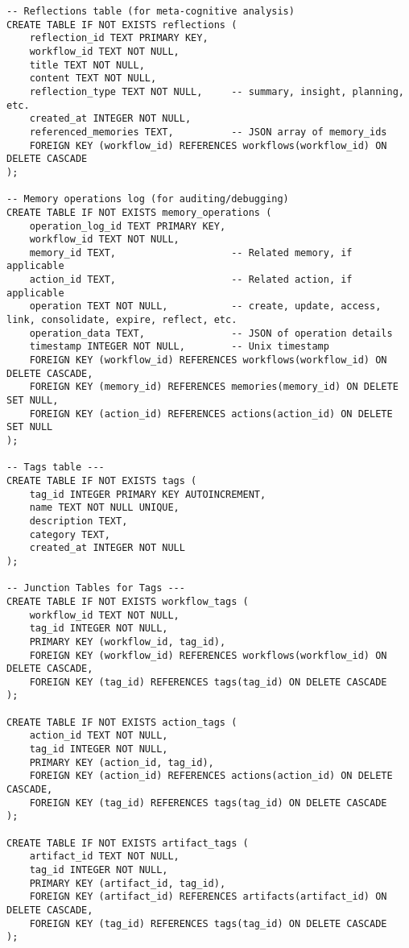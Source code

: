 \documentclass[12pt,a4paper]{article}
\begin{document}
\begin{pageablecode}
\begin{verbatim}
-- Reflections table (for meta-cognitive analysis)
CREATE TABLE IF NOT EXISTS reflections (
    reflection_id TEXT PRIMARY KEY,
    workflow_id TEXT NOT NULL,
    title TEXT NOT NULL,
    content TEXT NOT NULL,
    reflection_type TEXT NOT NULL,     -- summary, insight, planning, etc.
    created_at INTEGER NOT NULL,
    referenced_memories TEXT,          -- JSON array of memory_ids
    FOREIGN KEY (workflow_id) REFERENCES workflows(workflow_id) ON DELETE CASCADE
);

-- Memory operations log (for auditing/debugging)
CREATE TABLE IF NOT EXISTS memory_operations (
    operation_log_id TEXT PRIMARY KEY,
    workflow_id TEXT NOT NULL,
    memory_id TEXT,                    -- Related memory, if applicable
    action_id TEXT,                    -- Related action, if applicable
    operation TEXT NOT NULL,           -- create, update, access, link, consolidate, expire, reflect, etc.
    operation_data TEXT,               -- JSON of operation details
    timestamp INTEGER NOT NULL,        -- Unix timestamp
    FOREIGN KEY (workflow_id) REFERENCES workflows(workflow_id) ON DELETE CASCADE,
    FOREIGN KEY (memory_id) REFERENCES memories(memory_id) ON DELETE SET NULL,
    FOREIGN KEY (action_id) REFERENCES actions(action_id) ON DELETE SET NULL
);

-- Tags table ---
CREATE TABLE IF NOT EXISTS tags (
    tag_id INTEGER PRIMARY KEY AUTOINCREMENT,
    name TEXT NOT NULL UNIQUE,
    description TEXT,
    category TEXT,
    created_at INTEGER NOT NULL
);

-- Junction Tables for Tags ---
CREATE TABLE IF NOT EXISTS workflow_tags (
    workflow_id TEXT NOT NULL,
    tag_id INTEGER NOT NULL,
    PRIMARY KEY (workflow_id, tag_id),
    FOREIGN KEY (workflow_id) REFERENCES workflows(workflow_id) ON DELETE CASCADE,
    FOREIGN KEY (tag_id) REFERENCES tags(tag_id) ON DELETE CASCADE
);

CREATE TABLE IF NOT EXISTS action_tags (
    action_id TEXT NOT NULL,
    tag_id INTEGER NOT NULL,
    PRIMARY KEY (action_id, tag_id),
    FOREIGN KEY (action_id) REFERENCES actions(action_id) ON DELETE CASCADE,
    FOREIGN KEY (tag_id) REFERENCES tags(tag_id) ON DELETE CASCADE
);

CREATE TABLE IF NOT EXISTS artifact_tags (
    artifact_id TEXT NOT NULL,
    tag_id INTEGER NOT NULL,
    PRIMARY KEY (artifact_id, tag_id),
    FOREIGN KEY (artifact_id) REFERENCES artifacts(artifact_id) ON DELETE CASCADE,
    FOREIGN KEY (tag_id) REFERENCES tags(tag_id) ON DELETE CASCADE
);


\end{verbatim}
\end{pageablecode}
\end{document}
